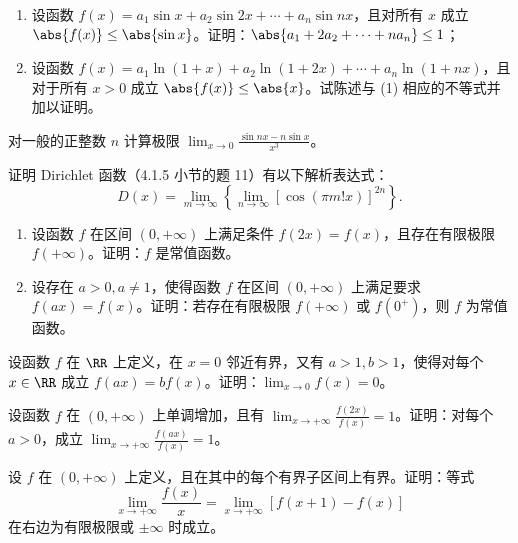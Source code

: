\begin{xreferenceproblem}[6]
\begin{enumerate}
    \item 设函数 $f(x)=a_1\sin x+a_2\sin2x+\cdots+a_n\sin nx$，且对所有 $x$ 成立 $\abs{f(x)}\leq\abs{\sin x}$。证明：$\abs{a_1+2a_2+\cdots+na_n}\leq1$；
    \item 设函数 $f(x)=a_1\ln(1+x)+a_2\ln(1+2x)+\cdots+a_n\ln(1+nx)$，且对于所有 $x>0$ 成立 $\abs{f(x)}\leq\abs{x}$。试陈述与 (1) 相应的不等式并加以证明。
  \end{enumerate}
\end{xreferenceproblem}

\begin{xreferenceproblem}[7]
对一般的正整数 $n$ 计算极限 $\displaystyle\lim_{x\to0}\frac{\sin nx-n\sin x}{x^3}$。
\end{xreferenceproblem}

\begin{xreferenceproblem}[8]
证明 Dirichlet 函数（4.1.5 小节的题 11）有以下解析表达式：
  \[
    D(x)=\lim_{m\to\infty}\left\{\lim_{n\to\infty}[\cos(\pi m!x)]^{2n}\right\}.
  \]
\end{xreferenceproblem}

\begin{xreferenceproblem}[9]
\begin{enumerate}
    \item 设函数 $f$ 在区间 $(0,+\infty)$ 上满足条件 $f(2x)=f(x)$，且存在有限极限 $f(+\infty)$。证明：$f$ 是常值函数。
    \item 设存在 $a>0,a\ne1$，使得函数 $f$ 在区间 $(0,+\infty)$ 上满足要求 $f(ax)=f(x)$。证明：若存在有限极限 $f(+\infty)$ 或 $f(0^+)$，则 $f$ 为常值函数。
  \end{enumerate}
\end{xreferenceproblem}

\begin{xreferenceproblem}[10]
设函数 $f$ 在 $\RR$ 上定义，在 $x=0$ 邻近有界，又有 $a>1,b>1$，使得对每个 $x\in\RR$ 成立 $f(ax)=bf(x)$。证明：$\lim_{x\to0}f(x)=0$。
\end{xreferenceproblem}

\begin{xreferenceproblem}[11]
设函数 $f$ 在 $(0,+\infty)$ 上单调增加，且有 $\displaystyle\lim_{x\to+\infty}\frac{f(2x)}{f(x)}=1$。证明：对每个 $a>0$，成立 $\displaystyle\lim_{x\to+\infty}\frac{f(ax)}{f(x)}=1$。
\end{xreferenceproblem}

\begin{xreferenceproblem}[12]
设 $f$ 在 $(0,+\infty)$ 上定义，且在其中的每个有界子区间上有界。证明：等式
  \[
    \lim_{x\to+\infty}\frac{f(x)}x=\lim_{x\to+\infty}[f(x+1)-f(x)]
  \]
  在右边为有限极限或 $\pm\infty$ 时成立。
\end{xreferenceproblem}


